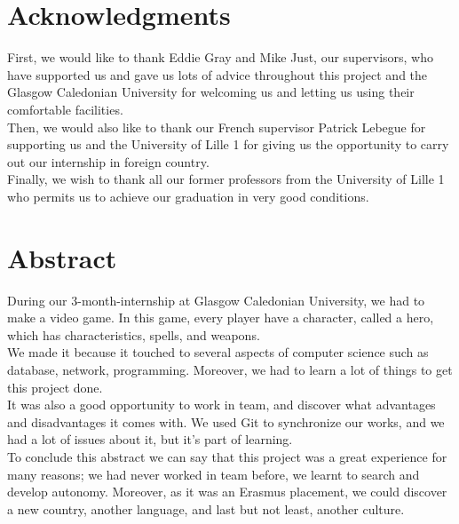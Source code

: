 \documentclass{scrreprt}
\begin{document}
\newcommand{\HRule}{\rule{\linewidth}{0.5mm}}


\chapter*{Acknowledgments} %
First, we would like to thank Eddie Gray and Mike Just, our supervisors, who have supported us and
gave us lots of advice throughout this project and the Glasgow Caledonian University for
welcoming us and letting us using their comfortable facilities.\\

	  Then, we would also like to thank our French supervisor Patrick Lebegue for supporting us
	  and the University of Lille 1 for giving us the opportunity to carry out our internship in foreign country.\\

	  Finally, we wish to thank all our former professors from the University of Lille 1 who
	  permits us to achieve our graduation in very good conditions.\\

	  \chapter*{Abstract}
	  During our 3-month-internship at Glasgow Caledonian University, we had to make a video game.
	  In this game, every player have a character, called a hero, which has characteristics, spells, and weapons.\\

	             We made it because it touched to several aspects of computer science such as database, network,
	 	  programming. Moreover, we had to learn a lot of things to get this project done.\\
		  It was also a good opportunity to work in team, and discover what advantages and disadvantages it comes with.
		  We used Git to synchronize our works, and we had a lot of issues about it, but it's part of learning.\\

		  To conclude this abstract we can say that this project was a great experience for many
		  reasons; we had never worked in team before, we learnt to search and develop
		  autonomy. Moreover, as it was an Erasmus placement, we could discover a new country,
		  another language, and last but not least, another culture.
\end{document}
